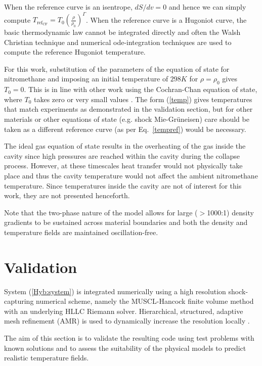 \documentclass[3p,times,twocolumn]{elsarticle}
\begin{document}
When the reference curve is an isentrope, $dS/dv=0$ and hence we can simply compute $T_{\text{ref}_\text{{CF}}}=T_0(\frac{\rho}{\rho_0})^\Gamma$. When the reference curve is a Hugoniot curve, the basic thermodynamic law cannot be integrated directly and often the Walsh Christian technique and numerical ode-integration techniques are used to compute the reference Hugoniot temperature. 

For this work, substitution of the parameters of the equation of state for nitromethane and imposing an initial temperature of $298K$ for $\rho=\rho_0$ gives $T_0=0$. This is in line with other work using the Cochran-Chan equation of state, where $T_0$ takes zero or very small values \cite{saurel1998riemann,massoni1999mechanistic,shukla2010interface,genetier2014effect}. The form (\ref{temp}) gives temperatures that match experiments as demonstrated in the validation section, but for other materials or other equations of state (e.g. shock Mie-Gr\"uneisen) care should be taken as a different reference curve (as per Eq.\ \ref{tempref}) would be necessary.

The ideal gas equation of state results in the overheating of the gas inside the cavity since high pressures are reached within the cavity during the collapse process. However, at these timescales heat transfer would not physically take place and thus the cavity temperature would not affect the ambient nitromethane temperature. Since temperatures inside the cavity are not of interest for this work, they are not presented henceforth.

Note that the two-phase nature of the model allows for large ($>$1000:1) density gradients to be sustained across material boundaries and both the density and temperature fields are maintained oscillation-free.




\section{Validation}
System (\ref{Hyb:system}) is integrated numerically using a high resolution shock-capturing numerical scheme, namely the 
MUSCL-Hancock finite volume method with an underlying HLLC Riemann solver. Hierarchical, structured, adaptive mesh refinement 
(AMR) is used to dynamically increase the resolution locally \cite{bates2007richtmyer}. 

The aim of this section is to validate the resulting code using test problems with known solutions and to assess the suitability of the physical models to predict realistic temperature fields.
\end{document}
